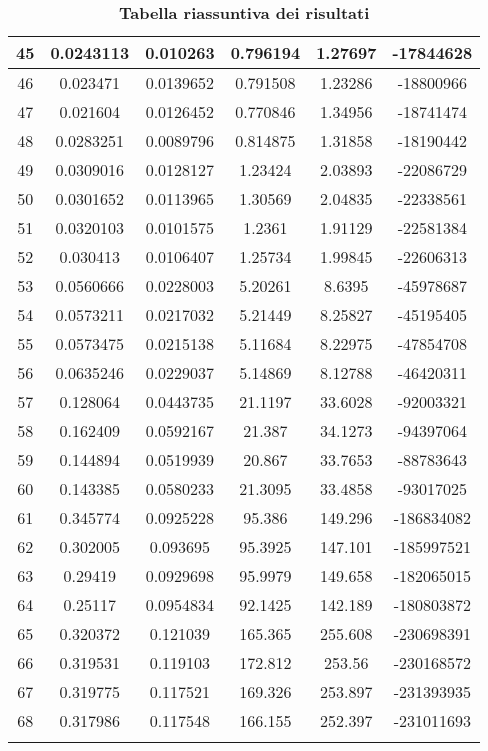 \begin{longtable}{|c|c|c|c|c|c|}
45 & 0.0243113 & 0.010263  & 0.796194  & 1.27697   & -17844628  \\ \hline
46 & 0.023471  & 0.0139652 & 0.791508  & 1.23286   & -18800966  \\ \hline
47 & 0.021604  & 0.0126452 & 0.770846  & 1.34956   & -18741474  \\ \hline
48 & 0.0283251 & 0.0089796 & 0.814875  & 1.31858   & -18190442  \\ \hline
49 & 0.0309016 & 0.0128127 & 1.23424   & 2.03893   & -22086729  \\ \hline
50 & 0.0301652 & 0.0113965 & 1.30569   & 2.04835   & -22338561  \\ \hline
51 & 0.0320103 & 0.0101575 & 1.2361    & 1.91129   & -22581384  \\ \hline
52 & 0.030413  & 0.0106407 & 1.25734   & 1.99845   & -22606313  \\ \hline
53 & 0.0560666 & 0.0228003 & 5.20261   & 8.6395    & -45978687  \\ \hline
54 & 0.0573211 & 0.0217032 & 5.21449   & 8.25827   & -45195405  \\ \hline
55 & 0.0573475 & 0.0215138 & 5.11684   & 8.22975   & -47854708  \\ \hline
56 & 0.0635246 & 0.0229037 & 5.14869   & 8.12788   & -46420311  \\ \hline
57 & 0.128064  & 0.0443735 & 21.1197   & 33.6028   & -92003321  \\ \hline
58 & 0.162409  & 0.0592167 & 21.387    & 34.1273   & -94397064  \\ \hline
59 & 0.144894  & 0.0519939 & 20.867    & 33.7653   & -88783643  \\ \hline
60 & 0.143385  & 0.0580233 & 21.3095   & 33.4858   & -93017025  \\ \hline
61 & 0.345774  & 0.0925228 & 95.386    & 149.296   & -186834082 \\ \hline
62 & 0.302005  & 0.093695  & 95.3925   & 147.101   & -185997521 \\ \hline
63 & 0.29419   & 0.0929698 & 95.9979   & 149.658   & -182065015 \\ \hline
64 & 0.25117   & 0.0954834 & 92.1425   & 142.189   & -180803872 \\ \hline
65 & 0.320372  & 0.121039  & 165.365   & 255.608   & -230698391 \\ \hline
66 & 0.319531  & 0.119103  & 172.812   & 253.56    & -230168572 \\ \hline
67 & 0.319775  & 0.117521  & 169.326   & 253.897   & -231393935 \\ \hline
68 & 0.317986  & 0.117548  & 166.155   & 252.397   & -231011693 \\ \hline
\caption{\textbf{Tabella riassuntiva dei risultati}}
\end{longtable}